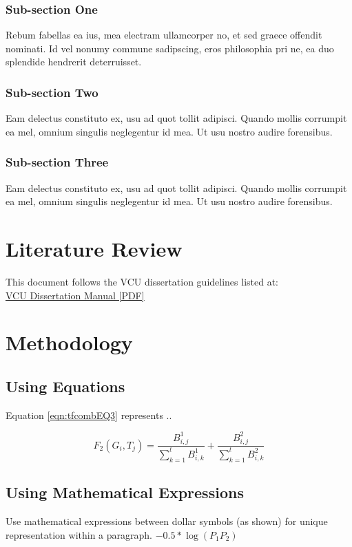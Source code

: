 \documentclass[copyright, reqno]{vcuthesis}
\numberwithin{equation}{chapter}
\begin{document}
\subsection{Sub-section One}
Rebum fabellas ea ius, mea electram ullamcorper no, et sed graece offendit nominati. Id vel nonumy commune sadipscing, eros philosophia pri ne, ea duo splendide hendrerit deterruisset. 
\subsection{Sub-section Two}
Eam delectus constituto ex, usu ad quot tollit adipisci. Quando mollis corrumpit ea mel, omnium singulis neglegentur id mea. Ut usu nostro audire forensibus.
\subsection{Sub-section Three}
Eam delectus constituto ex, usu ad quot tollit adipisci. Quando mollis corrumpit ea mel, omnium singulis neglegentur id mea. Ut usu nostro audire forensibus.

\chapter{Literature Review \label{chap:litreview}}
This document follows the VCU dissertation guidelines listed at:\\ \href{http://www.graduate.vcu.edu/pdfs/Thesis\%20and\%20Dissertation\%20Manual\%20Fall\%202012.pdf}{VCU Dissertation Manual [PDF]}
\chapter{Methodology \label{chap:methods}}
\section{Using Equations}
Equation \ref{eqn:tfcombEQ3} represents ..

\begin{equation}
F_{2}(G_{i}, T_{j}) = \dfrac{B^{1}_{i,j}}{\sum\limits_{k=1}^{t}B^{1}_{i,k}} + \dfrac{B^{2}_{i,j}}{\sum\limits_{k=1}^{t}B^{2}_{i,k}}
\label{eqn:tfcombEQ3}
\end{equation}

\section{Using Mathematical Expressions}
Use mathematical expressions between dollar symbols (as shown) for unique representation within a paragraph.
$-0.5*\log (P_{1}P_{2})$ \\
\end{document}
